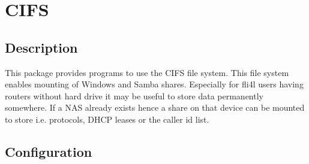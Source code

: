 {
\section {CIFS}
}

\subsection {Description}
  This package provides programs to use the CIFS file system.
  This file system enables mounting of Windows and Samba shares.
  Especially for fli4l users having routers without hard drive
  it may be useful to store data permanently somewhere. If a NAS
  already exists hence a share on that device can be mounted
  to store i.e. protocols, DHCP leases or the caller id list. 

\subsection{Configuration}


